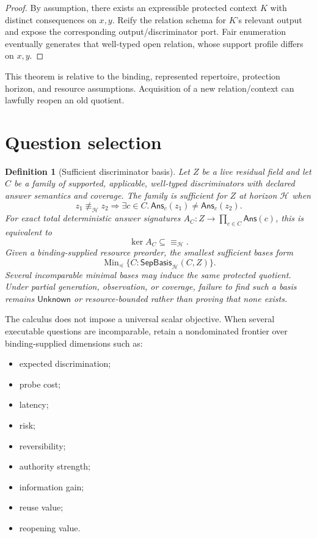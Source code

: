 \documentclass[11pt,oneside]{article}
\newtheorem{definition}{Definition}[section]
\begin{document}
\begin{proof}
By assumption, there exists an expressible protected context \(K\) with distinct consequences on \(x,y\).  Reify the relation schema for \(K\)'s relevant output and expose the corresponding output/discriminator port.  Fair enumeration eventually generates that well-typed open relation, whose support profile differs on \(x,y\).
\end{proof}

This theorem is relative to the binding, represented repertoire, protection horizon, and resource assumptions.  Acquisition of a new relation/context can lawfully reopen an old quotient.

\section{Question selection}

\begin{definition}[Sufficient discriminator basis]\label{def:separator-basis}
Let \(Z\) be a live residual field and let \(C\) be a family of supported, applicable,
well-typed discriminators with declared answer semantics and coverage.  The family is
sufficient for \(Z\) at horizon \(\mathcal H\) when
\[
\boxed{
z_1\not\equiv_{\mathcal H}z_2
\Longrightarrow
\exists c\in C.\,
\mathsf{Ans}_c(z_1)\neq\mathsf{Ans}_c(z_2).
}
\]
For exact total deterministic answer signatures
\(A_C:Z\to\prod_{c\in C}\mathsf{Ans}(c)\), this is equivalent to
\[
\boxed{\ker A_C\subseteq{\equiv_{\mathcal H}}.}
\]
Given a binding-supplied resource preorder, the smallest sufficient bases form
\[
\operatorname{Min}_{\preceq}
\{C:\mathsf{SepBasis}_{\mathcal H}(C,Z)\}.
\]
Several incomparable minimal bases may induce the same protected quotient.  Under
partial generation, observation, or coverage, failure to find such a basis remains
\(\mathsf{Unknown}\) or resource-bounded rather than proving that none exists.
\end{definition}

The calculus does not impose a universal scalar objective.  When several executable questions are incomparable, retain a nondominated frontier over binding-supplied dimensions such as:
\begin{itemize}
\item expected discrimination;
\item probe cost;
\item latency;
\item risk;
\item reversibility;
\item authority strength;
\item information gain;
\item reuse value;
\item reopening value.
\end{itemize}
\end{document}
